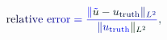 \documentclass[12pt]{article}
\begin{document}
\makeatletter
\renewcommand*{\@textcolor}[3]{%
  \protect\leavevmode
  \begingroup
    \color#1{#2}#3%
  \endgroup
}
\makeatother
\begin{displaymath}
\mathrm { \mathcolor[RGB]{0,0,15}{r} \mathcolor[RGB]{0,0,30}{e} \mathcolor[RGB]{0,0,45}{l} \mathcolor[RGB]{0,0,60}{a} \mathcolor[RGB]{0,0,75}{t} \mathcolor[RGB]{0,0,90}{i} \mathcolor[RGB]{0,0,105}{v} \mathcolor[RGB]{0,0,120}{e} ~ \mathcolor[RGB]{0,0,135}{e} \mathcolor[RGB]{0,0,150}{r} \mathcolor[RGB]{0,0,165}{r} \mathcolor[RGB]{0,0,180}{o} \mathcolor[RGB]{0,0,195}{r} } \mathcolor[RGB]{0,0,210}{=} \mathcolor[RGB]{0,0,225}{\frac { \mathcolor[RGB]{0,0,240}{\|} \mathcolor[RGB]{0,0,255}{\Tilde { \mathcolor[RGB]{0,15,0}{u} } } \mathcolor[RGB]{0,15,15}{-} \mathcolor[RGB]{0,15,30}{u} _ { \mathrm { \mathcolor[RGB]{0,15,45}{t} \mathcolor[RGB]{0,15,60}{r} \mathcolor[RGB]{0,15,75}{u} \mathcolor[RGB]{0,15,90}{t} \mathcolor[RGB]{0,15,105}{h} } } \mathcolor[RGB]{0,15,120}{\|} _ { \mathcolor[RGB]{0,15,135}{L} ^ { \mathcolor[RGB]{0,15,150}{2} } } } { \mathcolor[RGB]{0,15,165}{\|} \mathcolor[RGB]{0,15,180}{u} _ { \mathrm { \mathcolor[RGB]{0,15,195}{t} \mathcolor[RGB]{0,15,210}{r} \mathcolor[RGB]{0,15,225}{u} \mathcolor[RGB]{0,15,240}{t} \mathcolor[RGB]{0,15,255}{h} } } \mathcolor[RGB]{0,30,0}{\|} _ { \mathcolor[RGB]{0,30,15}{L} ^ { \mathcolor[RGB]{0,30,30}{2} } } } } \mathcolor[RGB]{0,30,45}{,}
\end{displaymath}
\end{document}
